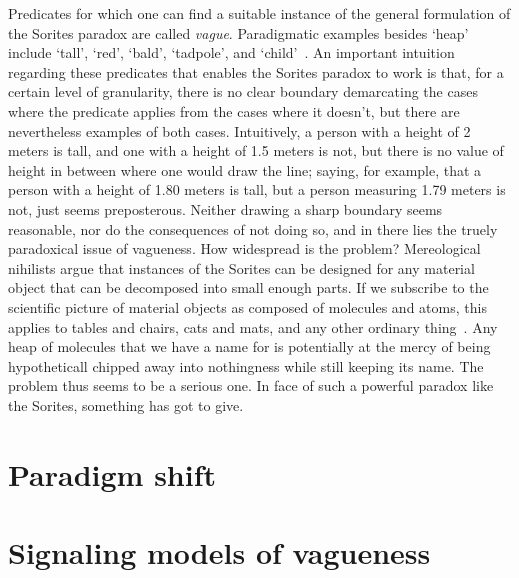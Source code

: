 \documentclass[a4paper]{article}
\begin{document}
Predicates for which one can find a suitable instance of the general formulation of the Sorites paradox are called \emph{vague}.
Paradigmatic examples besides `heap' include `tall', `red', `bald', `tadpole', and `child'~\citep{Keefe1997}.
An important intuition regarding these predicates that enables the Sorites paradox to work is that, for a certain level of granularity, there is no clear boundary demarcating the cases where the predicate applies from the cases where it doesn't, but there are nevertheless examples of both cases.
Intuitively, a person with a height of 2 meters is tall, and one with a height of 1.5 meters is not, but there is no value of height in between where one would draw the line; saying, for example, that a person with a height of 1.80 meters is tall, but a person measuring 1.79 meters is not, just seems preposterous.
Neither drawing a sharp boundary seems reasonable, nor do the consequences of not doing so, and in there lies the truely paradoxical issue of vagueness.
How widespread is the problem?
Mereological nihilists argue that instances of the Sorites can be designed for any material object that can be decomposed into small enough parts.
If we subscribe to the scientific picture of material objects as composed of molecules and atoms, this applies to tables and chairs, cats and mats, and any other ordinary thing~\citep{Unger1979}.
Any heap of molecules that we have a name for is potentially at the mercy of being hypotheticall chipped away into nothingness while still keeping its name.
The problem thus seems to be a serious one.
In face of such a powerful paradox like the Sorites, something has got to give.



\section{Paradigm shift}
\label{sec:Wittgenstein-and-signaling}

\section{Signaling models of vagueness}
\label{sec:vague-signaling}


\printbibliography
\end{document}
